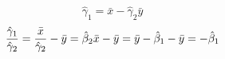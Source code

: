 \begin{problem}
\begin{sol}
\[ \hat{\gamma}_1 = \bar{x} - \hat{\gamma}_2 \bar{y} \]
\[ \frac{\hat{\gamma}_1}{\hat{\gamma}_2} = \frac{\bar{x}}{{\hat{\gamma}_2}} - \bar{y} =  \hat{\beta}_2 \bar{x} - \bar{y} = \bar{y} - \hat{\beta}_1 - \bar{y} = -\hat{\beta}_1  \]
%
%
%
%
%
%
%
%
%
%
%
%
%
%
%
%
%
%
%
%
%
%
%
%
%
%
%
\end{sol}
\end{problem}




